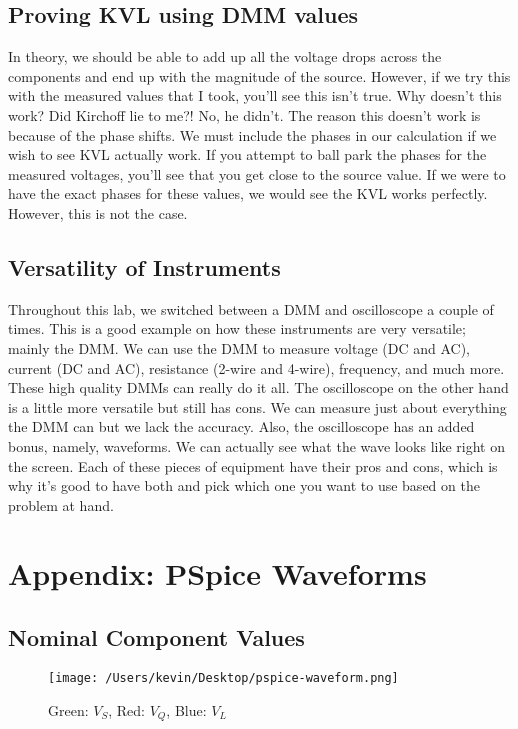 \documentclass[12pt,a4paper,titlepage]{article}
\begin{document}
\subsection{Proving KVL using DMM values}
In theory, we should be able to add up all the voltage drops across the
components and end up with the magnitude of the source. However, if we try this
with the measured values that I took, you'll see this isn't true. Why doesn't
this work? Did Kirchoff lie to me?! No, he didn't. The reason this doesn't
work is because of the phase shifts. We must include the phases in our
calculation if we wish to see KVL actually work. If you attempt to ball park
the phases for the measured voltages, you'll see that you get close to the 
source value. If we were to have the exact phases for
these values, we would see the KVL works perfectly. However, this is not the
case.

\subsection{Versatility of Instruments}
Throughout this lab, we switched between a DMM and oscilloscope a couple of times.
This is a good example on how these instruments are very versatile; mainly the
DMM. We can use the DMM to measure voltage (DC and AC), current (DC and AC),
resistance (2-wire and 4-wire), frequency, and much more. These high quality
DMMs can really do it all. The oscilloscope on the other hand is a little more
versatile but still has cons. We can measure just about everything the DMM
can but we lack the accuracy. Also, the oscilloscope has an added bonus,
namely, waveforms. We can actually see what the wave looks like right on the
screen. Each of these pieces of equipment have their pros and cons, which is
why it's good to have both and pick which one you want to use based on the
problem at hand.

\newpage

\appendix

\section{Appendix: PSpice Waveforms}

\subsection{Nominal Component Values}
\begin{figure}[ht!]
\centering
\texttt{[image: /Users/kevin/Desktop/pspice-waveform.png]}
\caption{Green: $V_S$, Red: $V_Q$, Blue: $V_L$ \label{overflow}}
\end{figure}
\end{document}
